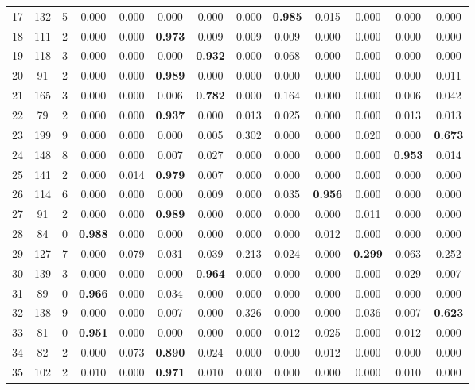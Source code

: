\documentclass[a4paper,fleqn,usenatbib]{mnras}
\begin{document}
\begin{table*}
\begin{tabular}{|c|c|c|c|c|c|c|c|c|c|c|c|c|}
17 & 132 & 5 & 0.000 & 0.000 & 0.000 & 0.000 & 0.000 & \textbf{0.985} & 0.015 & 0.000 & 0.000 & 0.000\\
18 & 111 & 2 & 0.000 & 0.000 & \textbf{0.973} & 0.009 & 0.009 & 0.009 & 0.000 & 0.000 & 0.000 & 0.000\\
19 & 118 & 3 & 0.000 & 0.000 & 0.000 & \textbf{0.932} & 0.000 & 0.068 & 0.000 & 0.000 & 0.000 & 0.000\\
20 & 91 & 2 & 0.000 & 0.000 & \textbf{0.989} & 0.000 & 0.000 & 0.000 & 0.000 & 0.000 & 0.000 & 0.011\\
21 & 165 & 3 & 0.000 & 0.000 & 0.006 & \textbf{0.782} & 0.000 & 0.164 & 0.000 & 0.000 & 0.006 & 0.042\\
22 & 79 & 2 & 0.000 & 0.000 & \textbf{0.937} & 0.000 & 0.013 & 0.025 & 0.000 & 0.000 & 0.013 & 0.013\\
23 & 199 & 9 & 0.000 & 0.000 & 0.000 & 0.005 & 0.302 & 0.000 & 0.000 & 0.020 & 0.000 & \textbf{0.673}\\
24 & 148 & 8 & 0.000 & 0.000 & 0.007 & 0.027 & 0.000 & 0.000 & 0.000 & 0.000 & \textbf{0.953} & 0.014\\
25 & 141 & 2 & 0.000 & 0.014 & \textbf{0.979} & 0.007 & 0.000 & 0.000 & 0.000 & 0.000 & 0.000 & 0.000\\
26 & 114 & 6 & 0.000 & 0.000 & 0.000 & 0.009 & 0.000 & 0.035 & \textbf{0.956} & 0.000 & 0.000 & 0.000\\
27 & 91 & 2 & 0.000 & 0.000 & \textbf{0.989} & 0.000 & 0.000 & 0.000 & 0.000 & 0.011 & 0.000 & 0.000\\
28 & 84 & 0 & \textbf{0.988} & 0.000 & 0.000 & 0.000 & 0.000 & 0.000 & 0.012 & 0.000 & 0.000 & 0.000\\
29 & 127 & 7 & 0.000 & 0.079 & 0.031 & 0.039 & 0.213 & 0.024 & 0.000 & \textbf{0.299} & 0.063 & 0.252\\
30 & 139 & 3 & 0.000 & 0.000 & 0.000 & \textbf{0.964} & 0.000 & 0.000 & 0.000 & 0.000 & 0.029 & 0.007\\
31 & 89 & 0 & \textbf{0.966} & 0.000 & 0.034 & 0.000 & 0.000 & 0.000 & 0.000 & 0.000 & 0.000 & 0.000\\
32 & 138 & 9 & 0.000 & 0.000 & 0.007 & 0.000 & 0.326 & 0.000 & 0.000 & 0.036 & 0.007 & \textbf{0.623}\\
33 & 81 & 0 & \textbf{0.951} & 0.000 & 0.000 & 0.000 & 0.000 & 0.012 & 0.025 & 0.000 & 0.012 & 0.000\\
34 & 82 & 2 & 0.000 & 0.073 & \textbf{0.890} & 0.024 & 0.000 & 0.000 & 0.012 & 0.000 & 0.000 & 0.000\\
35 & 102 & 2 & 0.010 & 0.000 & \textbf{0.971} & 0.010 & 0.000 & 0.000 & 0.000 & 0.000 & 0.010 & 0.000\\

\end{tabular}
\end{table*}
\end{document}
